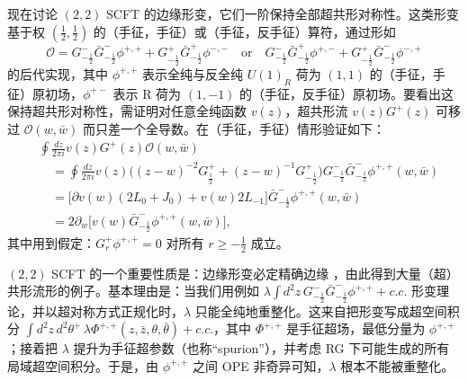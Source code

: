 现在讨论 $(2,2)$ SCFT 的边缘形变，它们一阶保持全部超共形对称性。这类形变基于权 $(\frac12,\frac12)$ 的（手征，手征）或（手征，反手征）算符，通过形如
\begin{equation}
  \label{eq:4-44}
  \mathcal{O}=G^-_{-\frac12}\bar G^-_{-\frac12}\phi^{+,+}+G^+_{-\frac12}\bar G^+_{-\frac12}\phi^{-,-}
  \quad\text{or}\quad
  G^-_{-\frac12}\bar G^+_{-\frac12}\phi^{+,-}+G^+_{-\frac12}\bar G^-_{-\frac12}\phi^{-,+}
\end{equation}
的后代实现，其中 $\phi^{+,+}$ 表示全纯与反全纯 $U(1)_R$ 荷为 $(1,1)$ 的（手征，手征）原初场，$\phi^{+-}$ 表示 R 荷为 $(1,-1)$ 的（手征，反手征）原初场。要看出这保持超共形对称性，需证明对任意全纯函数 $v(z)$，超共形流 $v(z)G^+(z)$ 可移过 $\mathcal{O}(w,\bar w)$ 而只差一个全导数。在（手征，手征）情形验证如下：
\begin{equation}
  \label{eq:4-45}
  \begin{aligned}
  &\oint\frac{dz}{2\pi i}v(z)G^+(z)\mathcal{O}(w,\bar w)\\
  &\quad=\oint\frac{dz}{2\pi i}v(z)\Big((z-w)^{-2}G^+_{\frac12}+(z-w)^{-1}G^+_{-\frac12}\Big)
    G^-_{-\frac12}\bar G^-_{-\frac12}\phi^{+,+}(w,\bar w)\\
  &\quad=\big[\partial v(w)(2L_0+J_0)+v(w)2L_{-1}\big]\bar G^-_{-\frac12}\phi^{+,+}(w,\bar w)\\
  &\quad=2\partial_w\Big[v(w)\bar G^-_{-\frac12}\phi^{+,+}(w,\bar w)\Big],
  \end{aligned}
\end{equation}
其中用到假定：$G^+_r\phi^{+,+}=0$ 对所有 $r\ge-\frac12$ 成立。


$(2,2)$ SCFT 的一个重要性质是：边缘形变必定精确边缘 \cite{r37,r38}，由此得到大量（超）共形流形的例子。基本理由是：当我们用例如 $\lambda\int d^2z\,G^-_{-\frac12}\bar G^-_{-\frac12}\phi^{+,+}+c.c.$ 形变理论，并以超对称方式正规化时，$\lambda$ 只能全纯地重整化。这来自把形变写成超空间积分 $\int d^2z\,d^2\theta^+\,\lambda\Phi^{+,+}(z,\bar z,\theta,\bar\theta)+c.c.$，其中 $\Phi^{+,+}$ 是手征超场，最低分量为 $\phi^{+,+}$；接着把 $\lambda$ 提升为手征超参数（也称“spurion”），并考虑 RG 下可能生成的所有局域超空间积分。于是，由 $\phi^{+,+}$ 之间 OPE 非奇异可知，$\lambda$ 根本不能被重整化。

